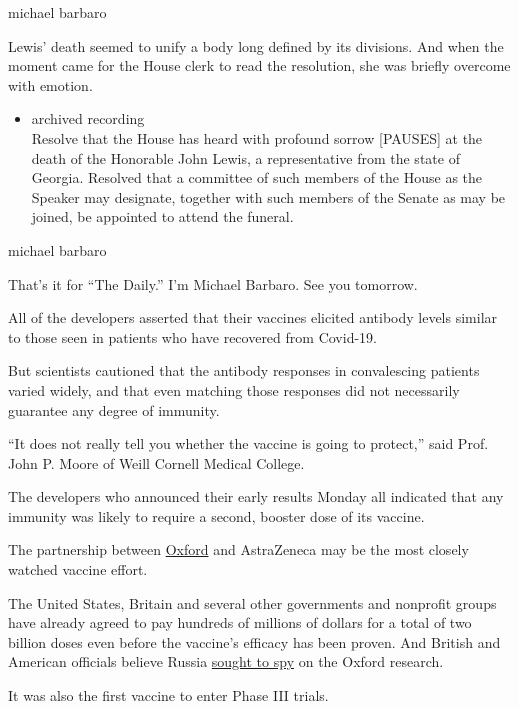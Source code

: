 michael barbaro

Lewis' death seemed to unify a body long defined by its divisions. And
when the moment came for the House clerk to read the resolution, she was
briefly overcome with emotion.

\begin{itemize}
\tightlist
\item
  archived recording\\
  Resolve that the House has heard with profound sorrow {[}PAUSES{]} at
  the death of the Honorable John Lewis, a representative from the state
  of Georgia. Resolved that a committee of such members of the House as
  the Speaker may designate, together with such members of the Senate as
  may be joined, be appointed to attend the funeral.
\end{itemize}

michael barbaro

That's it for ``The Daily.'' I'm Michael Barbaro. See you tomorrow.

All of the developers asserted that their vaccines elicited antibody
levels similar to those seen in patients who have recovered from
Covid-19.

But scientists cautioned that the antibody responses in convalescing
patients varied widely, and that even matching those responses did not
necessarily guarantee any degree of immunity.

``It does not really tell you whether the vaccine is going to protect,''
said Prof. John P. Moore of Weill Cornell Medical College.

The developers who announced their early results Monday all indicated
that any immunity was likely to require a second, booster dose of its
vaccine.

The partnership between
\href{https://www.nytimes3xbfgragh.onion/2020/04/27/world/europe/coronavirus-vaccine-update-oxford.html}{Oxford}
and AstraZeneca may be the most closely watched vaccine effort.

The United States, Britain and several other governments and nonprofit
groups have already agreed to pay hundreds of millions of dollars for a
total of two billion doses even before the vaccine's efficacy has been
proven. And British and American officials believe Russia
\href{https://www.nytimes3xbfgragh.onion/2020/07/16/us/politics/vaccine-hacking-russia.html}{sought
to spy} on the Oxford research.

It was also the first vaccine to enter Phase III trials.

